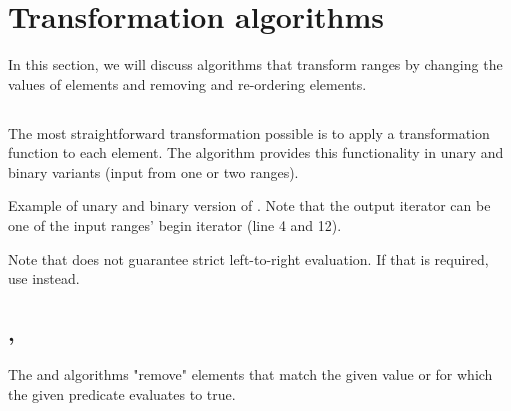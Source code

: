 \section{Transformation algorithms}

In this section, we will discuss algorithms that transform ranges by changing the values of elements and removing and re-ordering elements.

\subsection{\texorpdfstring{}{\texttt{std::transform}}}

The most straightforward transformation possible is to apply a transformation function to each element. The  algorithm provides this functionality in unary and binary variants (input from one or two ranges).



\begin{codebox}[]{\href{https://compiler-explorer.com/z/6W38nMh6b}{\ExternalLink}}
\footnotesize Example of unary and binary version of . Note that the output iterator can be one of the input ranges' begin iterator (line 4 and 12).
\tcblower
{}
\end{codebox}

Note that  does not guarantee strict left-to-right evaluation. If that is required, use  instead.

\subsection{\texorpdfstring{, }{\texttt{std::remove}, \texttt{std::remove\_if}}}

The  and  algorithms "remove" elements that match the given value or for which the given predicate evaluates to true.

